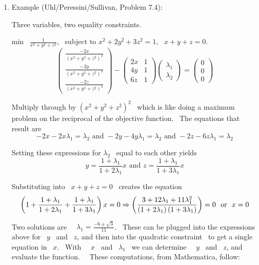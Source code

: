 \documentclass[12pt,thmsa]{article}
\begin{document}
\begin{enumerate}
\item  Example (Uhl/Peressini/Sullivan, Problem 7.4):

Three variables, two equality constraints.

min \ $\frac{1}{x^{2}+y^{2}+z^{2}}$, \ subject to $x^{2}+2y^{2}+3z^{2}=1$, \
$x+y+z=0$.
\[
\left(
\begin{array}{r}
\frac{-2x}{\left( x^{2}+y^{2}+z^{2}\right) ^{2}} \\
\frac{-2y}{\left( x^{2}+y^{2}+z^{2}\right) ^{2}} \\
\frac{-2z}{\left( x^{2}+y^{2}+z^{2}\right) ^{2}}
\end{array}
\right) -\left(
\begin{array}{rr}
2x & 1 \\
4y & 1 \\
6z & 1
\end{array}
\right) \left(
\begin{array}{r}
\lambda _{1} \\
\lambda _{2}
\end{array}
\right) =\left(
\begin{array}{r}
0 \\
0 \\
0
\end{array}
\right)
\]

Multiply through by $\left( x^{2}+y^{2}+z^{2}\right) ^{2}$ \ which is like
doing a maximum problem on the reciprocal of the objective function. \ The
equations that result are
\[
-2x-2x\lambda _{1}=\lambda _{2}\text{ \ and \ }-2y-4y\lambda _{1}=\lambda
_{2}\text{\ \ and }-2z-6z\lambda _{1}=\lambda _{2}
\]

Setting these expressions for $\lambda _{2}$ \ equal to each other yields
\[
y=\frac{1+\lambda _{1}}{1+2\lambda _{1}}x\text{ \ \ and \ }z=\frac{1+\lambda
_{1}}{1+3\lambda _{1}}x
\]

Substituting into \ $x+y+z=0$ \ creates the equation
\[
\left( 1+\frac{1+\lambda _{1}}{1+2\lambda _{1}}+\frac{1+\lambda _{1}}{%
1+3\lambda _{1}}\right) x=0\Rightarrow \left( \frac{3+12\lambda
_{1}+11\lambda _{1}^{2}}{\left( 1+2\lambda _{1}\right) \left( 1+3\lambda
_{1}\right) }\right) =0\text{ \ or \ }x=0
\]

Two solutions are \ \ $\lambda _{1}=\frac{-6\pm \sqrt{3}}{11}$. \ These can
be plugged into the expressions above for \ $y$ \ and \ $z$, and then into
the quadratic constraint \ to get a single equation in \ $x$. \ With \ \ $x$
\ and \ $\lambda _{1}$ \ we can determine \ \ $y$ \ and \ $z$, and evaluate
the function. \ \ These computations, from Mathematica, follow:


\end{enumerate}
\end{document}

